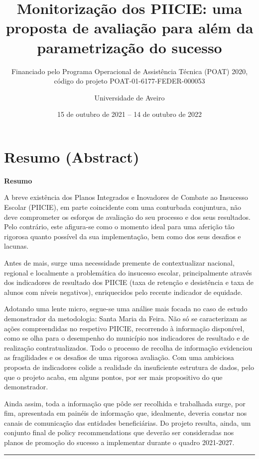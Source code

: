 \documentclass[
]{book}
\title{Monitorização dos PIICIE: uma proposta de avaliação para além da parametrização do sucesso}
\subtitle{Financiado pelo Programa Operacional de Assistência Técnica (POAT) 2020, código do projeto POAT-01-6177-FEDER-000053}
\author{Universidade de Aveiro}
\date{15 de outubro de 2021 -- 14 de outubro de 2022}
\begin{document}
\maketitle

{
\setcounter{tocdepth}{1}
\tableofcontents
}
\hypertarget{resumo-abstract}{%
\chapter*{\texorpdfstring{\textbf{Resumo (Abstract)}}{Resumo (Abstract)}}\label{resumo-abstract}}

\textbf{Resumo}

A breve existência dos Planos Integrados e Inovadores de Combate ao Insucesso Escolar (PIICIE), em parte coincidente com uma conturbada conjuntura, não deve comprometer os esforços de avaliação do seu processo e dos seus resultados. Pelo contrário, este afigura-se como o momento ideal para uma aferição tão rigorosa quanto possível da sua implementação, bem como dos seus desafios e lacunas.

Antes de mais, surge uma necessidade premente de contextualizar nacional, regional e localmente a problemática do insucesso escolar, principalmente através dos indicadores de resultado dos PIICIE (taxa de retenção e desistência e taxa de alunos com níveis negativos), enriquecidos pelo recente indicador de equidade.

Adotando uma lente micro, segue-se uma análise mais focada no caso de estudo demonstrador da metodologia: Santa Maria da Feira. Não só se caracterizam as ações compreendidas no respetivo PIICIE, recorrendo à informação disponível, como se olha para o desempenho do município nos indicadores de resultado e de realização contratualizados. Todo o processo de recolha de informação evidenciou as fragilidades e os desafios de uma rigorosa avaliação. Com uma ambiciosa proposta de indicadores colide a realidade da insuficiente estrutura de dados, pelo que o projeto acaba, em alguns pontos, por ser mais propositivo do que demonstrador.

Ainda assim, toda a informação que pôde ser recolhida e trabalhada surge, por fim, apresentada em painéis de informação que, idealmente, deveria constar nos canais de comunicação das entidades beneficiárias. Do projeto resulta, ainda, um conjunto final de policy recommendations que deverão ser consideradas nos planos de promoção do sucesso a implementar durante o quadro 2021-2027.

\begin{center}\rule{0.5\linewidth}{0.5pt}\end{center}
\end{document}
